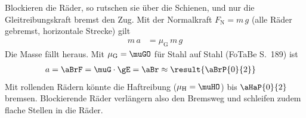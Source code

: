 Blockieren die Räder, so rutschen sie über die Schienen, und nur die Gleitreibungskraft bremst den Zug. Mit der Normalkraft $F_\mathrm{N} = m\,g$ (alle Räder gebremst, horizontale Strecke) gilt
\begin{align}
 m\,a &= \mu_\mathrm{G}\,m\,g
\end{align}
Die Masse fällt heraus. Mit $\mu_\mathrm{G} = \muGO$ für Stahl auf Stahl (FoTaBe S.~189) ist
\begin{align}
 a &= \aBrF = \muG\cdot\gE = \aBr \approx \result{\aBrP{0}{2}}
\end{align}
Mit rollenden Rädern könnte die Haftreibung ($\mu_\mathrm{H} = \muHO$) bis $\aHaP{0}{2}$ bremsen. Blockierende Räder verlängern also den Bremsweg und schleifen zudem flache Stellen in die Räder.
